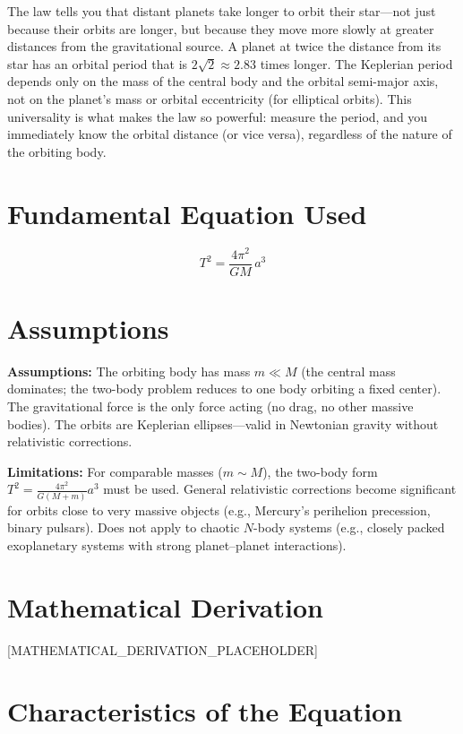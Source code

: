 \documentclass[11pt,openright]{book}
\begin{document}
The law tells you that distant planets take longer to orbit their star---not just because their orbits are longer, but because they move more slowly at greater distances from the gravitational source. A planet at twice the distance from its star has an orbital period that is $2\sqrt{2} \approx 2.83$ times longer. The Keplerian period depends only on the mass of the central body and the orbital semi-major axis, not on the planet's mass or orbital eccentricity (for elliptical orbits). This universality is what makes the law so powerful: measure the period, and you immediately know the orbital distance (or vice versa), regardless of the nature of the orbiting body.
\section*{Fundamental Equation Used}

\begin{equation}
T^2 = \frac{4\pi^2}{GM}\,a^3
\end{equation}
\section*{Assumptions}

\textbf{Assumptions:} The orbiting body has mass $m \ll M$ (the central mass dominates; the two-body problem reduces to one body orbiting a fixed center). The gravitational force is the only force acting (no drag, no other massive bodies). The orbits are Keplerian ellipses---valid in Newtonian gravity without relativistic corrections.


\textbf{Limitations:} For comparable masses ($m \sim M$), the two-body form $T^2 = \frac{4\pi^2}{G(M+m)}a^3$ must be used. General relativistic corrections become significant for orbits close to very massive objects (e.g., Mercury's perihelion precession, binary pulsars). Does not apply to chaotic $N$-body systems (e.g., closely packed exoplanetary systems with strong planet--planet interactions).


\section*{Mathematical Derivation}

[MATHEMATICAL_DERIVATION_PLACEHOLDER]

\section*{Characteristics of the Equation}
\end{document}
